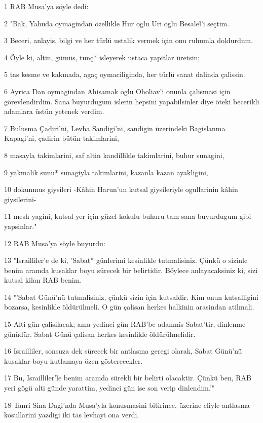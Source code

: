 \par 1 RAB Musa'ya söyle dedi:
\par 2 "Bak, Yahuda oymagindan özellikle Hur oglu Uri oglu Besalel'i seçtim.
\par 3 Beceri, anlayis, bilgi ve her türlü ustalik vermek için onu ruhumla doldurdum.
\par 4 Öyle ki, altin, gümüs, tunç* isleyerek ustaca yapitlar üretsin;
\par 5 tas kesme ve kakmada, agaç oymaciliginda, her türlü sanat dalinda çalissin.
\par 6 Ayrica Dan oymagindan Ahisamak oglu Oholiav'i onunla çalismasi için görevlendirdim. Sana buyurdugum islerin hepsini yapabilsinler diye öteki becerikli adamlara üstün yetenek verdim.
\par 7 Bulusma Çadiri'ni, Levha Sandigi'ni, sandigin üzerindeki Bagislanma Kapagi'ni, çadirin bütün takimlarini,
\par 8 masayla takimlarini, saf altin kandillikle takimlarini, buhur sunagini,
\par 9 yakmalik sunu* sunagiyla takimlarini, kazanla kazan ayakligini,
\par 10 dokunmus giysileri -Kâhin Harun'un kutsal giysileriyle ogullarinin kâhin giysilerini-
\par 11 mesh yagini, kutsal yer için güzel kokulu buhuru tam sana buyurdugum gibi yapsinlar."
\par 12 RAB Musa'ya söyle buyurdu:
\par 13 "Israilliler'e de ki, 'Sabat* günlerimi kesinlikle tutmalisiniz. Çünkü o sizinle benim aramda kusaklar boyu sürecek bir belirtidir. Böylece anlayacaksiniz ki, sizi kutsal kilan RAB benim.
\par 14 "'Sabat Günü'nü tutmalisiniz, çünkü sizin için kutsaldir. Kim onun kutsalligini bozarsa, kesinlikle öldürülmeli. O gün çalisan herkes halkinin arasindan atilmali.
\par 15 Alti gün çalisilacak; ama yedinci gün RAB'be adanmis Sabat'tir, dinlenme günüdür. Sabat Günü çalisan herkes kesinlikle öldürülmelidir.
\par 16 Israilliler, sonsuza dek sürecek bir antlasma geregi olarak, Sabat Günü'nü kusaklar boyu kutlamaya özen gösterecekler.
\par 17 Bu, Israilliler'le benim aramda sürekli bir belirti olacaktir. Çünkü ben, RAB yeri gögü alti günde yarattim, yedinci gün ise son verip dinlendim.'"
\par 18 Tanri Sina Dagi'nda Musa'yla konusmasini bitirince, üzerine eliyle antlasma kosullarini yazdigi iki tas levhayi ona verdi.

